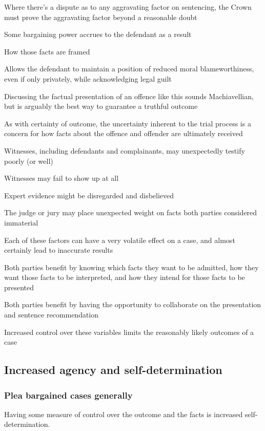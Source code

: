Where there's a dispute as to any aggravating factor on sentencing, the Crown must prove the aggravating factor beyond a reasonable doubt

Some bargaining power accrues to the defendant as a result

How those facts are framed

Allows the defendant to maintain a position of reduced moral blameworthiness, even if only privately, while acknowledging legal guilt

Discussing the factual presentation of an offence like this sounds Machiavellian, but is arguably the best way to guarantee a truthful outcome

As with certainty of outcome, the uncertainty inherent to the trial process is a concern for how facts about the offence and offender are ultimately received

Witnesses, including defendants and complainants, may unexpectedly testify poorly (or well)

Witnesses may fail to show up at all

Expert evidence might be disregarded and disbelieved

The judge or jury may place unexpected weight on facts both parties considered immaterial

Each of these factors can have a very volatile effect on a case, and almost certainly lead to inaccurate results

Both parties benefit by knowing which facts they want to be admitted, how they want those facts to be interpreted, and how they intend for those facts to be presented

Both parties benefit by having the opportunity to collaborate on the presentation and sentence recommendation

Increased control over these variables limits the reasonably likely outcomes of a case

\subsection{Increased agency and self-determination}

\subsubsection{Plea bargained cases generally}

Having some measure of control over the outcome and the facts is increased self-determination.

